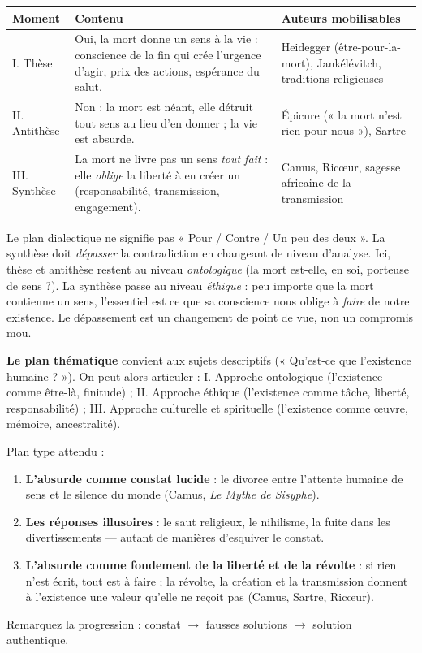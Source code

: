 \documentclass[11pt]{article}
\begin{document}
\begin{center}
\begin{tabularx}{\linewidth}{|l|X|X|}\hline
\rowcolor{popblueL} \textbf{Moment} & \textbf{Contenu} & \textbf{Auteurs mobilisables} \\ \hline
I. Thèse & Oui, la mort donne un sens à la vie : conscience de la fin qui crée l'urgence d'agir, prix des actions, espérance du salut. & Heidegger (être-pour-la-mort), Jankélévitch, traditions religieuses \\ \hline
II. Antithèse & Non : la mort est néant, elle détruit tout sens au lieu d'en donner ; la vie est absurde. & Épicure (« la mort n'est rien pour nous »), Sartre \\ \hline
III. Synthèse & La mort ne livre pas un sens \emph{tout fait} : elle \emph{oblige} la liberté à en créer un (responsabilité, transmission, engagement). & Camus, Ricœur, sagesse africaine de la transmission \\ \hline
\end{tabularx}
\end{center}

\begin{methode}
Le plan dialectique ne signifie pas « Pour / Contre / Un peu des deux ». La synthèse doit \emph{dépasser} la contradiction en changeant de niveau d'analyse. Ici, thèse et antithèse restent au niveau \emph{ontologique} (la mort est-elle, en soi, porteuse de sens ?). La synthèse passe au niveau \emph{éthique} : peu importe que la mort contienne un sens, l'essentiel est ce que sa conscience nous oblige à \emph{faire} de notre existence. Le dépassement est un changement de point de vue, non un compromis mou.
\end{methode}

\textbf{Le plan thématique} convient aux sujets descriptifs (« Qu'est-ce que l'existence humaine ? »). On peut alors articuler : I. Approche ontologique (l'existence comme être-là, finitude) ; II. Approche éthique (l'existence comme tâche, liberté, responsabilité) ; III. Approche culturelle et spirituelle (l'existence comme œuvre, mémoire, ancestralité).

\begin{exemplebox}
Plan type attendu :
\begin{enumerate}
\item \textbf{L'absurde comme constat lucide} : le divorce entre l'attente humaine de sens et le silence du monde (Camus, \emph{Le Mythe de Sisyphe}).
\item \textbf{Les réponses illusoires} : le saut religieux, le nihilisme, la fuite dans les divertissements — autant de manières d'esquiver le constat.
\item \textbf{L'absurde comme fondement de la liberté et de la révolte} : si rien n'est écrit, tout est à faire ; la révolte, la création et la transmission donnent à l'existence une valeur qu'elle ne reçoit pas (Camus, Sartre, Ricœur).
\end{enumerate}
Remarquez la progression : constat $\rightarrow$ fausses solutions $\rightarrow$ solution authentique.
\end{exemplebox}
\end{document}
